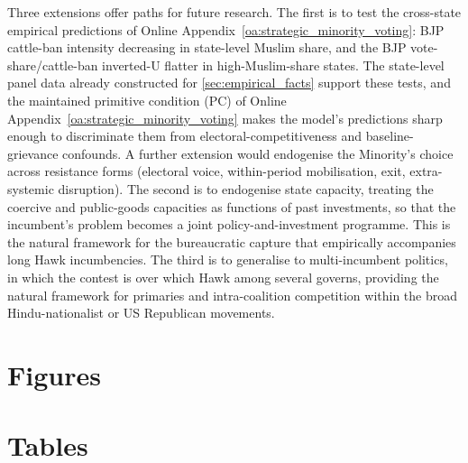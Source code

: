 \documentclass[11pt,twoside]{extarticle}
\begin{document}
Three extensions offer paths for future research. The first is to test the cross-state empirical predictions of Online Appendix~\ref{oa:strategic_minority_voting}: BJP cattle-ban intensity decreasing in state-level Muslim share, and the BJP vote-share/cattle-ban inverted-U flatter in high-Muslim-share states. The state-level panel data already constructed for \autoref{sec:empirical_facts} support these tests, and the maintained primitive condition (PC) of Online Appendix~\ref{oa:strategic_minority_voting} makes the model's predictions sharp enough to discriminate them from electoral-competitiveness and baseline-grievance confounds. A further extension would endogenise the Minority's choice across resistance forms (electoral voice, within-period mobilisation, exit, extra-systemic disruption). The second is to endogenise state capacity, treating the coercive and public-goods capacities as functions of past investments, so that the incumbent's problem becomes a joint policy-and-investment programme. This is the natural framework for the bureaucratic capture that empirically accompanies long Hawk incumbencies. The third is to generalise to multi-incumbent politics, in which the contest is over which Hawk among several governs, providing the natural framework for primaries and intra-coalition competition within the broad Hindu-nationalist or US Republican movements.


\clearpage
\newpage
\singlespacing
\footnotesize


\begingroup

\endgroup

\normalsize
\clearpage
\section{Figures}


\clearpage
\section{Tables}


\end{document}
